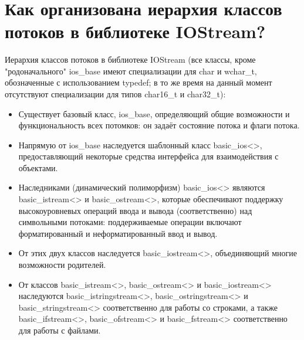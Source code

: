 \documentclass[a4paper,12pt]{article}	%
\title{
	\center{\textbf{Seminar 18.}}
	}
\begin{document}

\maketitle

\section{Как организована иерархия классов потоков в библиотеке IOStream?}

	Иерархия классов потоков в библиотеке IOStream (все классы, кроме "родоначального" ios\_base имеют специализации для char и wchar\_t, обозначенные с использованием typedef; в то же время на данный момент отсутствуют специализации для типов char16\_t и char32\_t):
	
	\begin{itemize}
	
		\item Существует базовый класс, ios\_base, определяющий общие возможности и функциональность всех потомков: он задаёт состояние потока и флаги потока.
		
		\item Напрямую от ios\_base наследуется шаблонный класс basic\_ios<>, предоставляющий некоторые средства интерфейса для взаимодействия с объектами.
		
		\item Наследниками (динамический полиморфизм) basic\_ios<> являются basic\_istream<> и basic\_ostream<>, которые обеспечивают поддержку высокоуровневых операций ввода и вывода (соответственно) над символьными потоками: поддерживаемые операции включают форматированный и неформатированный ввод и вывод.
		
		\item От этих двух классов наследуется basic\_iostream<>, объединяющий многие возможности родителей. 
		
		\item От классов basic\_istream<>, basic\_ostream<> и basic\_iostream<> наследуются  basic\_istringstream<>, basic\_ostringstream<> и basic\_stringstream<> соответственно для работы со строками, а также basic\_ifstream<>, basic\_ofstream<> и basic\_fstream<> соответственно для работы с файлами.
	
	\end{itemize}
	
\end{document}
